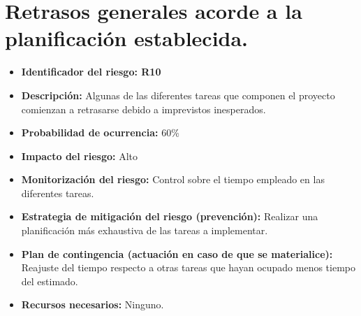 \section{Retrasos generales acorde a la planificación establecida.}
\begin{itemize}
	\item \textbf{Identificador del riesgo: R10}
	\item \textbf{Descripción: } Algunas de las diferentes tareas que componen el proyecto comienzan a retrasarse debido a imprevistos inesperados.
	\item \textbf{Probabilidad de ocurrencia: } 60\%
	\item \textbf{Impacto del riesgo: } Alto
	\item \textbf{Monitorización del riesgo: } Control sobre el tiempo empleado en las diferentes tareas.
	\item \textbf{Estrategia de mitigación del riesgo (prevención): } Realizar una planificación más exhaustiva de las tareas a implementar.
	\item \textbf{Plan de contingencia (actuación en caso de que se materialice): } Reajuste del tiempo respecto a otras tareas que hayan ocupado menos tiempo del estimado.
	\item \textbf{Recursos necesarios: } Ninguno.
\end{itemize} 

%
%

       
